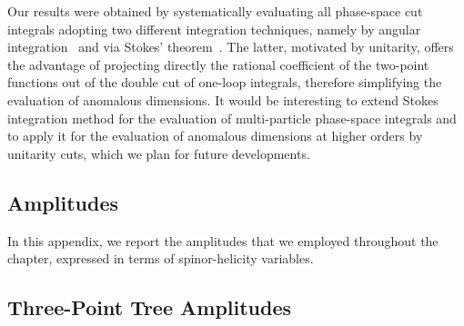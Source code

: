 Our results were obtained by systematically evaluating all phase-space cut integrals adopting two different integration techniques, namely by angular integration~\cite{Zwiebel:2011bx} and via Stokes' theorem~\cite{Mastrolia:2009dr}. The latter, motivated by unitarity, offers the advantage of projecting directly the rational coefficient of the two-point functions out of the double cut of one-loop integrals, therefore simplifying the evaluation of anomalous dimensions.  
It would be interesting to extend Stokes integration method for the evaluation of multi-particle phase-space integrals and to apply it for the evaluation of anomalous dimensions at higher orders by unitarity cuts, which we plan for future developments.

\begin{subappendices}

\section{Amplitudes}
\label{app:ALP_amplitudes_RGE}

In this appendix, we report the amplitudes that we employed throughout the chapter, expressed
in terms of spinor-helicity variables.

\subsection{Three-Point Tree Amplitudes}


\end{subappendices}
